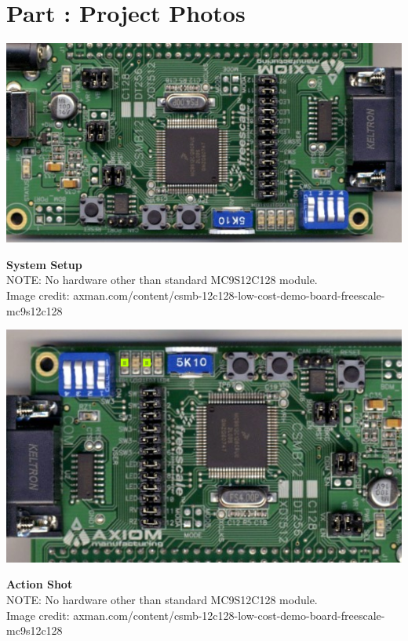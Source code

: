 \documentclass{article}
\newcounter{partNum}
\newcommand{\partNum}{%
        \stepcounter{partNum}%
        \thepartNum}
\newcommand{\sectPart}[1]{\section*{Part \partNum: #1}}
\begin{document}

\newpage

\sectPart{Project Photos}

    \begin{center}
        \includegraphics[scale=0.5]{system_setup.png}

        \textbf{System Setup} \\
        NOTE: No hardware other than standard MC9S12C128 module. \\
        Image credit: axman.com/content/csmb-12c128-low-cost-demo-board-freescale-mc9s12c128
    \end{center}

    \begin{center}
        \includegraphics[scale=0.5]{action_shot.png}

        \textbf{Action Shot} \\
        NOTE: No hardware other than standard MC9S12C128 module. \\
        Image credit: axman.com/content/csmb-12c128-low-cost-demo-board-freescale-mc9s12c128
    \end{center}
\end{document}
